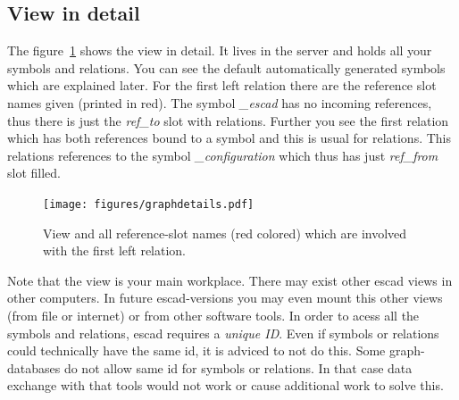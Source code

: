 \documentclass[a4paper, 12pt, openany]{scrbook}
\begin{document}
\subsection{View in detail}
The figure~\ref{fig:graphdetail} shows the view in detail. It lives in the server and holds all your symbols and relations. You can see the default automatically generated symbols which are explained later. For the first left relation there are the reference slot names given (printed in red). The symbol \emph{\_escad} has no incoming references, thus there is just the \emph{ref\_to} slot with relations. Further you see the first relation which has both references bound to a symbol and this is usual for relations. This relations references to the symbol \emph{\_configuration} which thus has just \emph{ref\_from} slot filled.
\begin{figure}[htbp]
  \centering
  \texttt{[image: figures/graphdetails.pdf]}
  \caption{View and all reference-slot names (red colored) which are involved with the first left relation.}
  \label{fig:graphdetail}
\end{figure}
Note that the view is your main workplace. There may exist other escad views in other computers. In future escad-versions you may even mount this other views (from file or internet) or from other software tools. In order to acess all the symbols and relations, escad requires a \emph{unique ID}. Even if symbols or relations could technically have the same id, it is adviced to not do this. Some graph-databases do not allow same id for symbols or relations. In that case data exchange with that tools would not work or cause additional work to solve this.
\end{document}

